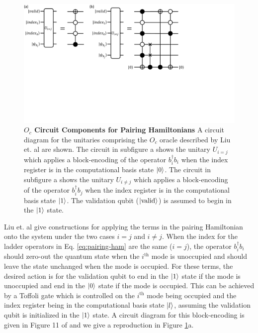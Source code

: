 \begin{figure}[h]
    \includegraphics[width=12cm]{figures/liu-O_c.pdf}
    \caption{
        \textbf{$O_c$ Circuit Components for Pairing Hamiltonians}
        A circuit diagram for the unitaries comprising the $O_c$ oracle described by Liu et. al \cite{liu2024efficient} are shown.
        The circuit in subfigure a shows the unitary $U_{i = j}$ which applies a block-encoding of the operator $b_i^\dagger b_i$ when the index register is in the computational basis state $\ket{0}$. 
        The circuit in subfigure a shows the unitary $U_{i \neq j}$ which applies a block-encoding of the operator $b_i^\dagger b_j$ when the index register is in the computational basis state $\ket{1}$.
        The validation qubit ($\ket{\text{valid}}$) is assumed to begin in the $\ket{1}$ state.
    }
    \label{fig:liu-O_c}
\end{figure}

Liu et. al give constructions for applying the terms in the pairing Hamiltonian onto the system under the two cases $i = j$ and $i \neq j$.
When the index for the ladder operators in Eq. \ref{eq:pairing-ham} are the same ($i = j$), the operator $b_i^\dagger b_i$ should zero-out the quantum state when the $i^\text{th}$ mode is unoccupied and should leave the state unchanged when the mode is occupied. 
For these terms, the desired action is for the validation qubit to end in the $\ket{1}$ state if the mode is unoccupied and end in the $\ket{0}$ state if the mode is occupied.
This can be achieved by a Toffoli gate which is controlled on the $i^\text{th}$ mode being occupied and the index register being in the computational basis state $\ket{l}$, assuming the validation qubit is initialized in the $\ket{1}$ state.
A circuit diagram for this block-encoding is given in Figure 11 of \cite{liu2024efficient} and we give a reproduction in Figure \ref{fig:liu-O_c}a.

